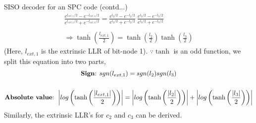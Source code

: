 \begin{frame}{SISO decoder for an SPC code (contd...)}
\begin{gather*} 
    \frac{e^{l_{ext, 1}/2} - e^{-l_{ext, 1}/2}}{e^{l_{ext, 1}/2} + e^{-l_{ext, 1}/2}} = \frac{e^{l_2/2} - e^{-l_2/2}}{e^{l_2/2} + e^{-l_2/2}} \ \frac{e^{l_3/2} - e^{-l_3/2}}{e^{l_3/2} + e^{-l_3/2}} \\~\\
    \Rightarrow \tanh \left (\frac{l_{ext, 1}}{2}\right) = \tanh \left (\frac{l_{2}}{2}\right) \tanh \left (\frac{l_{3}}{2}\right)
\end{gather*}
(Here, $l_{ext, 1}$ is the extrinsic LLR of bit-node 1).
$\because \tanh$ is an odd function, we split this equation into two parts,
\begin{gather*}
    \text{\textbf{Sign}: }sgn(l_{ext, 1}) = sgn(l_2) sgn(l_3) \\~\\
    \text{\textbf{Absolute value}: } \left|log \left(\tanh \left (\frac{|l_{ext, 1}|}{2}\right)\right)\right| = \left|log \left(\tanh \left (\frac{|l_{2}|}{2}\right)\right)\right| + \left|log \left(\tanh \left (\frac{|l_{3}|}{2}\right)\right)\right|
\end{gather*}
Similarly, the extrinsic LLR's for $c_2$ and $c_3$ can be derived.
\end{frame}

